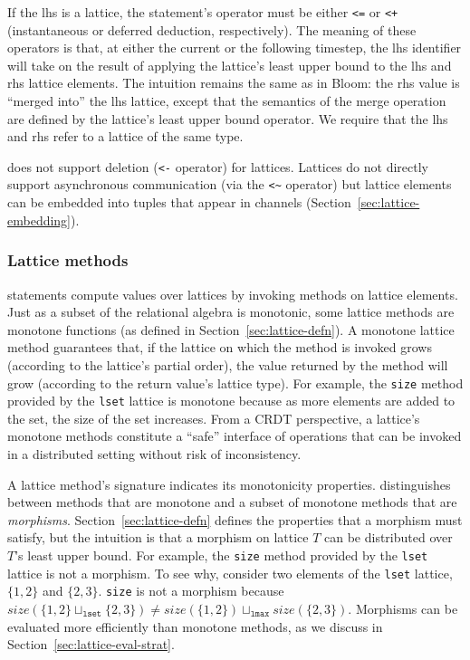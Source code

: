 If the lhs is a lattice, the statement's operator must be either \verb|<=| or
\verb|<+| (instantaneous or deferred deduction, respectively). The meaning of
these operators is that, at either the current or the following timestep, the lhs
identifier will take on the result of applying the lattice's least upper bound
to the lhs and rhs lattice elements. The intuition remains the same as in Bloom:
the rhs value is ``merged into'' the lhs lattice, except that the semantics of
the merge operation are defined by the lattice's least upper bound operator. We
require that the lhs and rhs refer to a lattice of the same type.

\lang does not support deletion (\verb|<-| operator) for lattices. Lattices do
not directly support asynchronous communication (via the \verb|<~| operator) but
lattice elements can be embedded into tuples that appear in channels
(Section~\ref{sec:lattice-embedding}).

\subsubsection{Lattice methods}
\lang statements compute values over lattices by invoking methods on lattice
elements. Just as a subset of the relational algebra is monotonic, some lattice
methods are monotone functions (as defined in Section~\ref{sec:lattice-defn}). A
monotone lattice method guarantees that, if the lattice on which the method is
invoked grows (according to the lattice's partial order), the value returned by
the method will grow (according to the return value's lattice type). For
example, the \texttt{size} method provided by the \texttt{lset} lattice is
monotone because as more elements are added to the set, the size of the set
increases. From a CRDT perspective, a lattice's monotone methods constitute a
``safe'' interface of operations that can be invoked in a distributed setting
without risk of inconsistency.

A lattice method's signature indicates its monotonicity properties. \lang
distinguishes between methods that are monotone and a subset of monotone methods
that are \emph{morphisms}. Section~\ref{sec:lattice-defn} defines the properties
that a morphism must satisfy, but the intuition is that a morphism on lattice
$T$ can be distributed over $T$'s least upper bound. For example, the
\texttt{size} method provided by the \texttt{lset} lattice is not a morphism. To
see why, consider two elements of the \texttt{lset} lattice, $\{1,2\}$ and
$\{2,3\}$.  \texttt{size} is not a morphism because $size(\{1,2\}
\sqcup_{\mathtt{lset}} \{2,3\}) \ne size(\{1,2\}) \sqcup_{\mathtt{lmax}}
size(\{2,3\})$. Morphisms can be evaluated more efficiently than monotone
methods, as we discuss in Section~\ref{sec:lattice-eval-strat}.

